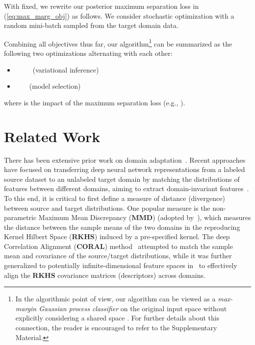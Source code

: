 \documentclass[10pt,letterpaper]{article}
\begin{document}
With  fixed, we rewrite our posterior maximum separation loss in (\ref{eq:max_marg_obj}) as follows.  We consider stochastic optimization with a random mini-batch  sampled from the target domain data.




Combining all objectives thus far, our algorithm\footnote{
In the algorithmic point of view, our algorithm can be viewed as a {\em max-margin Gaussian process classifier} on the original input space  without explicitly considering a shared space . For further details about this connection, the reader is encouraged to refer to the Supplementary Material. 
} can be summarized as the following two optimizations alternating with each other: \begin{mdframed}
\begin{itemize}
\item  \ \ \ \ \ (variational inference)
\item  \ \ \ \ (model selection)
\end{itemize}
\end{mdframed}
where  is the impact of the maximum separation loss (e.g., ).







\section{Related Work}\label{sec:related}

There has been extensive prior work on domain adaptation~\cite{csurka2017comprehensive}. 
Recent  approaches  have  focused  on transferring  deep  neural  network  representations  from  a labeled source dataset to an unlabeled target domain by matching the distributions of features between different domains, aiming to extract domain-invariant features~\cite{rebuffi2017learning,benaim2017one,courty2017joint,motiian2017few,saito2017asymmetric,Zhang_2017_CVPR,Yan_2017_CVPR,bousmalis2017unsupervised,mancini2018boosting,rozantsev2018residual}.
To this end, it is critical to first define a measure of distance (divergence) between source and target distributions. One popular measure is the non-parametric Maximum Mean Discrepancy (\textbf{MMD}) (adopted by~\cite{bousmalis2017unsupervised,zellinger2017central,long2014transfer}), which measures the distance between the sample means of the two domains in the reproducing Kernel Hilbert Space (\textbf{RKHS}) induced by a pre-specified kernel. The deep Correlation Alignment (\textbf{CORAL}) method~\cite{sun2016deep} attempted to match the sample mean and covariance of the source/target distributions, while it was further generalized to potentially infinite-dimensional feature spaces in~\cite{zhang2018aligning} to effectively align the \textbf{RKHS} covariance matrices (descriptors) across domains. 
\end{document}

